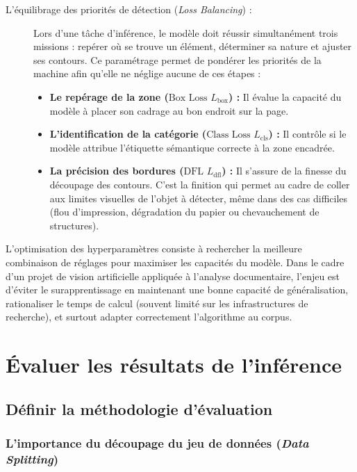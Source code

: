 \begin{description}
	\item[L'équilibrage des priorités de détection (\textit{Loss Balancing}) :]\hfill
	Lors d'une tâche d'inférence, le modèle doit réussir simultanément trois missions : repérer où se trouve un élément, déterminer sa nature et ajuster ses contours. Ce paramétrage permet de pondérer les priorités de la machine afin qu'elle ne néglige aucune de ces étapes : \hfill
	\begin{itemize}
		\item \textbf{Le repérage de la zone ($\text{Box Loss } L_{\text{box}}$) :} Il évalue la capacité du modèle à placer son cadrage au bon endroit sur la page.
		\item \textbf{L'identification de la catégorie ($\text{Class Loss } L_{\text{cls}}$) :} Il contrôle si le modèle attribue l'étiquette sémantique correcte à la zone encadrée.
		\item \textbf{La précision des bordures ($\text{DFL } L_{\text{dfl}}$) :} Il s'assure de la finesse du découpage des contours. C'est la finition qui permet au cadre de coller aux limites visuelles de l'objet à détecter, même dans des cas difficiles (flou d'impression, dégradation du papier ou chevauchement de structures).
	\end{itemize}
\end{description}

L'optimisation des hyperparamètres consiste à rechercher la meilleure combinaison de réglages pour maximiser les capacités du modèle. Dans le cadre d'un projet de vision artificielle appliquée à l'analyse documentaire, l'enjeu est d'éviter le surapprentissage en maintenant une bonne capacité de généralisation, rationaliser le temps de calcul (souvent limité sur les infrastructures de recherche), et surtout adapter correctement l'algorithme au corpus. 

\section{Évaluer les résultats de l'inférence}

\subsection{Définir la méthodologie d'évaluation}

\subsubsection{L'importance du découpage du jeu de données (\textit{Data Splitting})}


